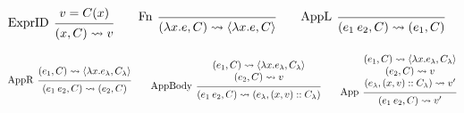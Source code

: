 \documentclass{article}
\theoremstyle{definition}
\newcommand*{\cons}{::}
\newcommand*{\semarrow}{\rightsquigarrow}
\begin{document}
\begin{figure}[h!]
  \begin{flushright}
    \fbox{$(e,C)\semarrow V\text{ or }(e',C')$}
  \end{flushright}
  \centering
  \vspace{0pt} %
  \[
    \begin{prooftree}
      \hypo{v=C(x)}
      \infer[left label=ExprID]1{
      (x, C)
      \semarrow
      v
      }
    \end{prooftree}\qquad
    \begin{prooftree}
      \infer[left label=Fn]0{
      (\lambda x.e, C)
      \semarrow
      \langle\lambda x.e, C\rangle
      }
    \end{prooftree}\qquad
    \begin{prooftree}
      \infer[left label={AppL}]0{
      (e_{1}\:e_{2}, C)
      \semarrow
      (e_{1},C)
      }
    \end{prooftree}
  \]

  \[
    \begin{prooftree}
    \hypo{
      \begin{matrix}
        (e_{1}, C)
        \semarrow
        \langle\lambda x.e_{\lambda}, C_{\lambda}\rangle
      \end{matrix}
    }
    \infer[left label={AppR}]1{
    (e_{1}\:e_{2}, C)
    \semarrow
    (e_{2}, C)
    }
    \end{prooftree}\qquad
    \begin{prooftree}
      \hypo{
        \begin{matrix}
          (e_{1}, C)
          \semarrow
          \langle\lambda x.e_{\lambda}, C_{\lambda}\rangle \\
          (e_{2}, C)
          \semarrow
          v
        \end{matrix}
      }
      \infer[left label={AppBody}]1{
      (e_{1}\:e_{2}, C)
      \semarrow
      (e_{\lambda}, (x, v)\cons C_{\lambda})
      }
    \end{prooftree}\qquad
    \begin{prooftree}
      \hypo{
        \begin{matrix}
          (e_{1}, C)
          \semarrow
          \langle\lambda x.e_{\lambda}, C_{\lambda}\rangle \\
          (e_{2}, C)
          \semarrow
          v                                                \\
          (e_{\lambda}, (x, v)\cons C_{\lambda})
          \semarrow
          v'
        \end{matrix}
      }
      \infer[left label={App}]1{
      (e_{1}\:e_{2}, C)
      \semarrow
      v'
      }
    \end{prooftree}
  \]


\end{figure}
\end{document}
